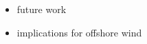 \documentclass{article}
\begin{document}
\begin{itemize}
    \item future work
    \item implications for offshore wind
\end{itemize}

\clearpage








\end{document}
